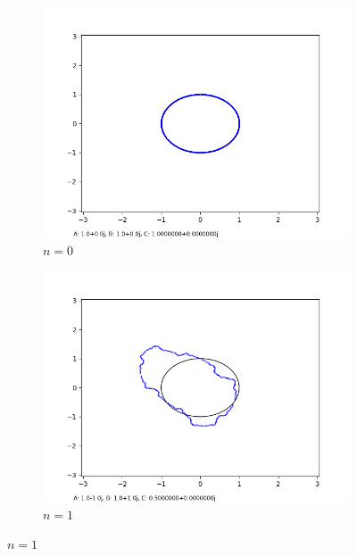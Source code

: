 \documentclass[12pt,a4paper,reqno,parskip=full]{amsart}
\numberwithin{equation}{section}
\theoremstyle{plain}
\theoremstyle{definition}
\begin{document}
\begin{figure}[H]
     \centering
     \captionsetup{justification=centering,font=small}
     
     \begin{subfigure}[b]{0.3\textwidth}
         \centering
         \includegraphics[width=\textwidth]{images/nn/a0 b0 h100 d0.001 fixed xy.png}
         \caption{$n=0$}
         \label{fig:n0}
     \end{subfigure}
     \hfill
     \begin{subfigure}[b]{0.3\textwidth}
         \centering
         \includegraphics[width=\textwidth]{images/nn/a-1 b1 h30 d0.01.png}
         \caption{$n=1$}
         \label{fig:n1}
     \end{subfigure}

\end{figure}
\end{document}
